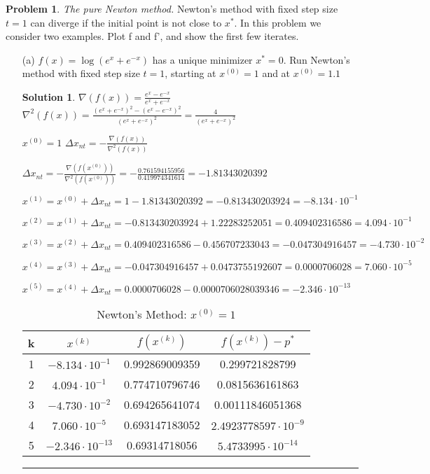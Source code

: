\documentclass{article}
\theoremstyle{definition}
\newtheorem{problem}{Problem}
\def\fline{\rule{0.75\linewidth}{0.5pt}}
\newcommand{\finishline}{\begin{center}\fline\end{center}}
\newtheorem*{solution*}{Solution}
\newenvironment{solution}{\begin{solution*}}{{\finishline} \end{solution*}}
\begin{document}
\begin{problem} \textit{The pure Newton method.} Newton’s method with fixed step size $t = 1$ can diverge if the initial point is not close to $x^*$. In this problem we consider two examples. Plot f and f', and show the first few iterates.
\begin{enumerate}
    \item[(a)] $f(x) = \log{(e^x + e^{-x})}$ has a unique minimizer $x^* = 0$. Run Newton’s method with fixed step size $t = 1$, starting at $x^{(0)} = 1$ and at $x^{(0)} = 1.1$
    \begin{solution}

    $\nabla(f(x)) = \frac{e^x - e^{-x}}{e^x + e^{-x}}$ \newline 
    $\nabla^2(f(x)) = \frac{(e^x + e^{-x})^2 - (e^x - e^{-x})^2}{(e^x + e^{-x})^2} = \frac{4}{(e^x + e^{-x})^2}$

    $x^{(0)} = 1$ \newline 
    $\Delta x_{nt} = -\frac{\nabla(f(x))}{\nabla^2(f(x))}$ \newline 

    $\Delta x_{nt} = -\frac{\nabla(f(x^{(0)}))}{\nabla^2(f(x^{(0)}))} = - \frac{0.761594155956}{0.419974341614} = -1.81343020392$ \newline 

    $x^{(1)} = x^{(0)} + \Delta x_{nt} = 1 - 1.81343020392 = -0.813430203924 = -8.134 \cdot 10^{-1}$

    $x^{(2)} = x^{(1)} + \Delta x_{nt} = -0.813430203924 + 1.22283252051 = 0.409402316586 = 4.094 \cdot 10^{-1}$

    $x^{(3)} = x^{(2)} + \Delta x_{nt} = 0.409402316586 - 0.456707233043 = - 0.047304916457 = -4.730 \cdot 10^{-2}$

    $x^{(4)} = x^{(3)} + \Delta x_{nt} = -0.047304916457 + 0.0473755192607 = 0.0000706028 = 7.060 \cdot 10^{-5}$
    
    $x^{(5)} = x^{(4)} + \Delta x_{nt} = 0.0000706028 - 0.0000706028039346 = -2.346 \cdot 10^{-13}$

    \begin{table}[h]
    \centering
    \begin{tabular}{|c|c|c|c|}
        \hline
        k & $x^{(k)}$ & $f(x^{(k)})$ & $f(x^{(k)}) - p^*$ \\
        \hline
        1 & $-8.134 \cdot 10^{-1}$ & 0.992869009359 & 0.299721828799 \\
        2 & $4.094 \cdot 10^{-1}$ & 0.774710796746 & 0.0815636161863\\
        3 & $-4.730 \cdot 10^{-2}$ & 0.694265641074 & 0.00111846051368\\
        4 & $7.060 \cdot 10^{-5}$ & 0.693147183052 & $2.4923778597 \cdot 10^{-9}$\\
        5 & $-2.346 \cdot 10^{-13}$ & 0.69314718056 & $5.4733995 \cdot 10^{-14}$\\
        \hline
    \end{tabular}
    \caption{Newton's Method: $x^{(0)} = 1$}
    \label{tab:mytable}
\end{table}



\end{solution}
\end{enumerate}
\end{problem}
\end{document}
